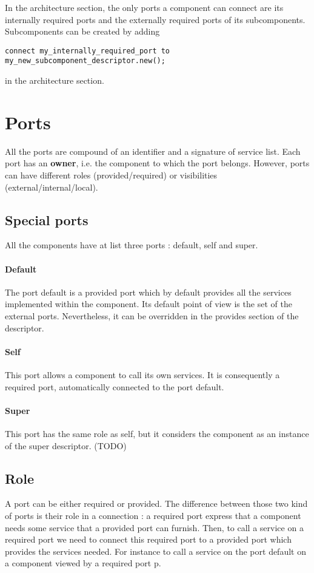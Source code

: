 In the architecture section, the only ports a component can connect are its internally required ports and the externally required ports of its subcomponents. Subcomponents can be created by adding
\begin{lstlisting}
connect my_internally_required_port to my_new_subcomponent_descriptor.new();
\end{lstlisting}
in the architecture section.




\section{Ports}
All the ports are compound of an identifier and a signature of service list. Each port has an \textbf{owner}, i.e. the component to which the port belongs. However, ports can have different roles (provided/required) or visibilities (external/internal/local).
\subsection{Special ports}
\label{special_port}
All the components have at list three ports : \textsf{default}, \textsf{self} and \textsf{super}. 

\paragraph{Default}
The port \textsf{default} is a provided port which by default provides all the services implemented within the component. Its default point of view is the set of the external ports. Nevertheless, it can be overridden in the \textsf{provides} section of the descriptor.
\paragraph{Self} This port allows a component to call its own services. It is consequently a required port, automatically connected to the port \textsf{default}.
\paragraph{Super} This port has the same role as \textsf{self}, but it considers the component as an instance of the super descriptor. (TODO)
\subsection{Role}
\label{port_role}
A port can be either required or provided. The difference between those two kind of ports is their role in a connection : a required port express that a component needs some service that a provided port can furnish. Then, to call a service on a required port we need to connect this required port to a provided port which provides the services needed. For instance to call a service on the port \textsf{default} on a component viewed by a required port \textsf{p}.

